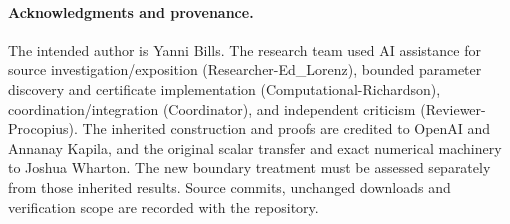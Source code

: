 \documentclass[11pt]{article}
\theoremstyle{remark}\newtheorem*{remark}{Scope}
\begin{document}
\paragraph{Acknowledgments and provenance.}
The intended author is Yanni Bills. The research team used AI assistance
for source investigation/exposition (Researcher-Ed\_Lorenz), bounded
parameter discovery and certificate implementation (Computational-Richardson),
coordination/integration (Coordinator), and independent criticism
(Reviewer-Procopius). The inherited construction and proofs are credited
to OpenAI and Annanay Kapila, and the original scalar transfer and exact
numerical machinery to Joshua Wharton. The new boundary treatment must
be assessed separately from those inherited results. Source commits,
unchanged downloads and verification scope are recorded with the repository.

\begingroup\small


\endgroup
\end{document}
